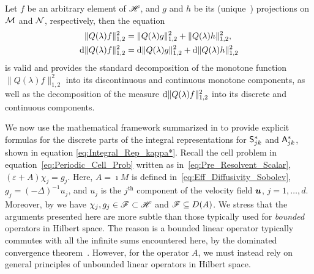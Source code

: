 \documentclass[amsa]{ipart}
\begin{document}
\begin{theorem}
Let $f$ be an arbitrary element of $\mathscr{H}$, and $g$ and $h$ be its
(unique~\cite{Folland:99:RealAnalysis}) 
projections on $\mathcal{M}$ and $\mathcal{N}$, respectively, then the equation
%
\begin{align}\label{eq:Disc_Cont_Measures}
  \|Q(\lambda)f\|_{1,2}^2&=\|Q(\lambda)g\|_{1,2}^2+\|Q(\lambda)h\|_{1,2}^2,
  \\
  \d\|Q(\lambda)f\|_{1,2}^2&=\d\|Q(\lambda)g\|_{1,2}^2+\d\|Q(\lambda)h\|_{1,2}^2
  \notag
\end{align}
%
is valid and provides the standard decomposition of the monotone
function 
$\|Q(\lambda)f\|_{1,2}^2$ into its discontinuous and continuous monotone
components, as well as the decomposition of the measure
$\mathrm{d}\|Q(\lambda)f\|_{1,2}^2$ into its discrete and continuous components.  
\end{theorem}
%






We now use the mathematical framework summarized in
 to provide explicit formulas for the
discrete parts of the integral representations for $\mathsf{S}^*_{jk}$
and $\mathsf{A}^*_{jk}$, shown in equation
\eqref{eq:Integral_Rep_kappa*}. Recall the cell problem
in equation~\eqref{eq:Periodic_Cell_Prob} written as
in~\eqref{eq:Pre_Resolvent_Scalar}, $(\varepsilon+A)\chi_j=g_j$. Here, $A=\imath M$ 
is defined in~\eqref{eq:Eff_Diffusivity_Sobolev}, $g_j=(-\Delta)^{-1}u_j$,
and $u_j$ is the $j^{\text{th}}$ component of the velocity field
$\boldsymbol{u}$, $j=1,\ldots,d$. Moreover, by  we have
$\chi_j,g_j\in\mathscr{F}\subset\mathscr{H}$ and $\mathscr{F}\subseteq D(A)$. We stress that the arguments
presented here are more subtle 
than those typically used for \emph{bounded} operators in Hilbert
space. The reason is a bounded linear operator typically commutes with
all the infinite sums encountered here, by the dominated convergence
theorem~\cite{Folland:99:RealAnalysis}. However, for the operator $A$,
we must instead rely on general principles of unbounded linear operators in
Hilbert space.  
\end{document}
